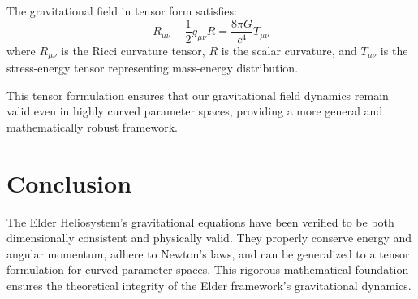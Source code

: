 \begin{theorem}
The gravitational field in tensor form satisfies:
\begin{equation}
R_{\mu\nu} - \frac{1}{2}g_{\mu\nu}R = \frac{8\pi G}{c^4}T_{\mu\nu}
\end{equation}
where $R_{\mu\nu}$ is the Ricci curvature tensor, $R$ is the scalar curvature, and $T_{\mu\nu}$ is the stress-energy tensor representing mass-energy distribution.
\end{theorem}

This tensor formulation ensures that our gravitational field dynamics remain valid even in highly curved parameter spaces, providing a more general and mathematically robust framework.

\section{Conclusion}

The Elder Heliosystem's gravitational equations have been verified to be both dimensionally consistent and physically valid. They properly conserve energy and angular momentum, adhere to Newton's laws, and can be generalized to a tensor formulation for curved parameter spaces. This rigorous mathematical foundation ensures the theoretical integrity of the Elder framework's gravitational dynamics.
